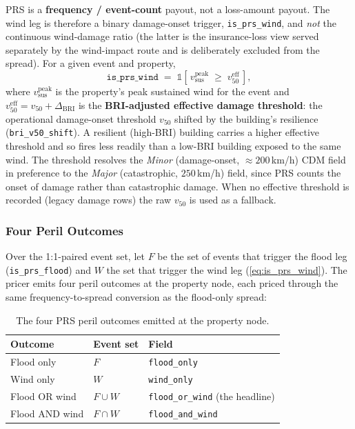 \documentclass[11pt,a4paper]{article}
\begin{document}
PRS is a \textbf{frequency / event-count} payout, not a loss-amount payout. The
wind leg is therefore a binary damage-onset trigger, \texttt{is\_prs\_wind}, and
\emph{not} the continuous wind-damage ratio (the latter is the insurance-loss
view served separately by the wind-impact route and is deliberately excluded
from the spread). For a given event and property,
\begin{equation}
    \texttt{is\_prs\_wind} \;=\; \mathbb{1}\!\left[\, v^{\text{peak}}_{\text{sus}}
    \;\ge\; v_{50}^{\text{eff}} \,\right],
    \label{eq:is_prs_wind}
\end{equation}
where $v^{\text{peak}}_{\text{sus}}$ is the property's peak sustained wind for
the event and $v_{50}^{\text{eff}} = v_{50} + \Delta_{\text{BRI}}$ is the
\textbf{BRI-adjusted effective damage threshold}: the operational
damage-onset threshold $v_{50}$ shifted by the building's resilience
(\texttt{bri\_v50\_shift}). A resilient (high-BRI) building carries a higher
effective threshold and so fires less readily than a low-BRI building exposed to
the same wind. The threshold resolves the \emph{Minor} (damage-onset, $\approx
200$\,km/h) CDM field in preference to the \emph{Major} (catastrophic,
$250$\,km/h) field, since PRS counts the onset of damage rather than
catastrophic damage. When no effective threshold is recorded (legacy damage
rows) the raw $v_{50}$ is used as a fallback.

\subsubsection{Four Peril Outcomes}

Over the 1:1-paired event set, let $F$ be the set of events that trigger the
flood leg (\texttt{is\_prs\_flood}) and $W$ the set that trigger the wind leg
(\eqref{eq:is_prs_wind}). The pricer emits four peril outcomes at the
property node, each priced through the same frequency-to-spread conversion as
the flood-only spread:

\begin{table}[H]
    \centering
    \begin{tabular}{lll}
        \toprule
        \textbf{Outcome} & \textbf{Event set} & \textbf{Field} \\
        \midrule
        Flood only      & $F$            & \texttt{flood\_only} \\
        Wind only       & $W$            & \texttt{wind\_only} \\
        Flood OR wind   & $F \cup W$     & \texttt{flood\_or\_wind} (the headline) \\
        Flood AND wind  & $F \cap W$     & \texttt{flood\_and\_wind} \\
        \bottomrule
    \end{tabular}
    \caption{The four PRS peril outcomes emitted at the property node.}
    \label{tab:peril_outcomes}
\end{table}
\end{document}
